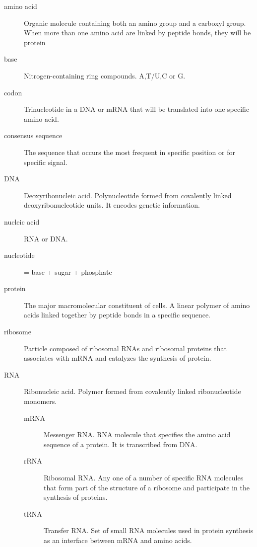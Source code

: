 
\begin{description}
\item[amino acid] Organic molecule containing both an amino group and a
	   carboxyl group. When more than one amino acid are linked by
	   peptide bonds, they will be protein
\item[base] Nitrogen-containing ring compounds. A,T/U,C or G.
\item[codon] Trinucleotide in a DNA or mRNA that will be translated into 
	   one specific amino acid.
\item[consensus sequence] The sequence that occurs the most frequent in specific position or for specific signal.
\item[DNA] Deoxyribonucleic acid. Polynucleotide formed from covalently linked deoxyribonucleotide units. It encodes genetic information.
\item[nucleic acid] RNA or DNA.
\item[nucleotide] = base + sugar + phosphate
\item[protein] The major macromolecular constituent of cells. A linear
	   polymer of amino acids linked together by peptide bonds in
	   a specific sequence.
\item[ribosome] Particle composed of ribosomal RNAs and ribosomal proteins that associates with mRNA and catalyzes the synthesis of protein.
\item[RNA] Ribonucleic acid. Polymer formed from covalently linked ribonucleotide monomers.
   \begin{description}
   \item[mRNA] Messenger RNA. RNA molecule that specifies the amino acid sequence of a protein. It is transcribed from DNA.
   \item[rRNA] Ribosomal RNA. Any one of a number of specific RNA molecules that form part of the structure of a ribosome and participate in the synthesis of proteins.
   \item[tRNA] Transfer RNA. Set of small RNA molecules used in protein synthesis as an interface between mRNA and amino acids.
   \end{description}
\end{description}
